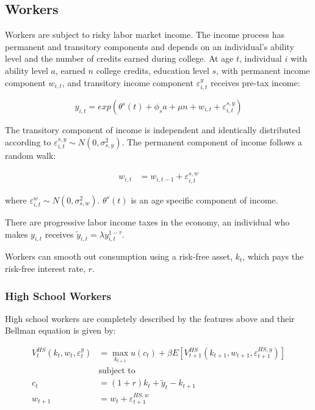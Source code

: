 \subsection{Workers}

  Workers are subject to risky labor market income. The income process has permanent and transitory
  components and depends on an individual's ability level and the number of credits earned during
  college. At age $t$, individual $i$ with ability level $a$, earned $n$ college credits, education
  level $s$, with permanent income component $w_{i, t}$, and transitory income component
  $\varepsilon^y_{i, t}$ receives pre-tax income:

  $$y_{i, t} = exp(\theta^s(t) + \phi_s a + \mu n + w_{i, t} + \varepsilon^{s, y}_{i, t})$$

  The transitory component of income is independent and identically distributed according to
  $\varepsilon^{s, y}_{i, t} \sim N(0, \sigma^2_{s, y})$. The permanent component of income follows
  a random walk:

  \begin{align*}
    w_{i, t} &= w_{i, t-1} + \varepsilon^{s, w}_{i, t}
  \end{align*}

  where $\varepsilon^w_{i, t} \sim N(0, \sigma^2_{s, w})$. $\theta^s(t)$ is an age specific
  component of income.

  There are progressive labor income taxes in the economy, an individual who makes $y_{i, t}$
  receives $\tilde{y}_{i, t} = \lambda y_{i, t}^{1 - \tau}$.

  Workers can smooth out consumption using a risk-free asset, $k_t$, which pays the risk-free
  interest rate, $r$.


  \subsubsection{High School Workers}

    High school workers are completely described by the features above and their Bellman equation
    is given by:

    \begin{align*}
      V^{HS}_t(k_t, w_t, \varepsilon^y_t) &= \max_{k_{t+1}} u(c_t) + \beta E \left[ V^{HS}_{t+1}(k_{t+1}, w_{t+1}, \varepsilon^{HS, y}_{t+1}) \right] \\
      &\text{subject to } \\
      c_t &= (1 + r) k_t + \tilde{y}_t - k_{t+1} \\
      w_{t+1} &= w_t + \varepsilon^{HS, w}_{t+1}
    \end{align*}


